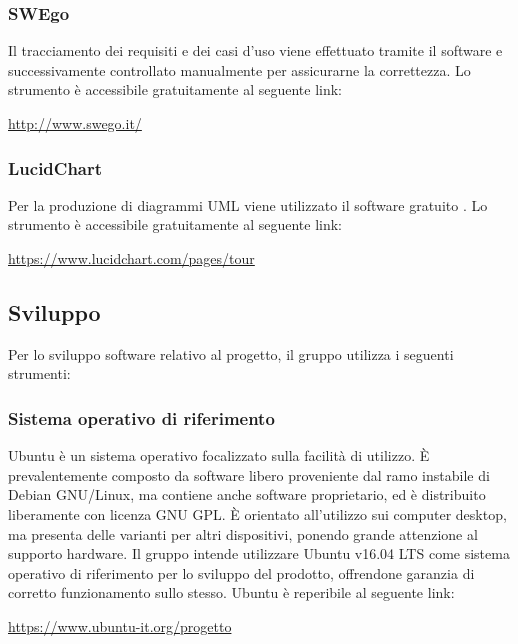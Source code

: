 \documentclass[../NormediProgetto.tex]{subfiles}
\begin{document}
	\subsubsection{SWEgo} Il tracciamento dei requisiti e dei casi d'uso viene effettuato tramite il software  e successivamente controllato manualmente per assicurarne la correttezza. Lo strumento è accessibile gratuitamente al seguente link:
	\begin{center}
		\url{http://www.swego.it/}
	\end{center}
		
	\subsubsection{LucidChart}
	Per la produzione di diagrammi UML viene utilizzato il software gratuito . Lo strumento è accessibile gratuitamente al seguente link:
	\begin{center}
		\url{https://www.lucidchart.com/pages/tour}
	\end{center}


	\subsection{Sviluppo}

	Per lo sviluppo software relativo al progetto, il gruppo utilizza i seguenti strumenti:
	
	\subsubsection{Sistema operativo di riferimento}
	Ubuntu è un sistema operativo focalizzato sulla facilità di utilizzo. È prevalentemente composto da software libero proveniente dal ramo instabile di Debian GNU/Linux, ma contiene anche software proprietario, ed è distribuito liberamente con licenza GNU GPL. È orientato all'utilizzo sui computer desktop, ma presenta delle varianti per altri dispositivi, ponendo grande attenzione al supporto hardware. Il gruppo intende utilizzare Ubuntu v16.04 LTS come sistema operativo di riferimento per lo sviluppo del prodotto, offrendone garanzia di corretto funzionamento sullo stesso. Ubuntu è reperibile al seguente link:
	\begin{center}
		\url{https://www.ubuntu-it.org/progetto}
	\end{center}
	
\end{document}
